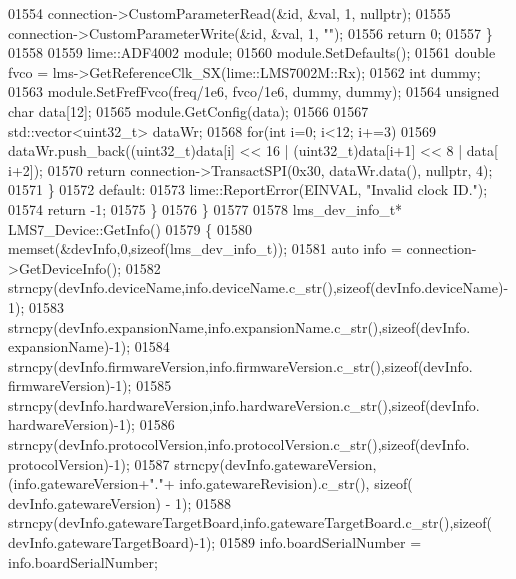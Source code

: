 \begin{DoxyCode}
{{{01554                 connection->CustomParameterRead(&\textcolor{keywordtype}{id}, &val, 1, \textcolor{keyword}{nullptr});
01555                 connection->CustomParameterWrite(&\textcolor{keywordtype}{id}, &val, 1, \textcolor{stringliteral}{""});
01556                 \textcolor{keywordflow}{return} 0;
01557             \}
01558 
01559             lime::ADF4002 module;
01560             module.SetDefaults();
01561             \textcolor{keywordtype}{double} fvco = lms->GetReferenceClk_SX(lime::LMS7002M::Rx);
01562             \textcolor{keywordtype}{int} dummy;
01563             module.SetFrefFvco(freq/1e6, fvco/1e6, dummy, dummy);
01564             \textcolor{keywordtype}{unsigned} \textcolor{keywordtype}{char} data[12];
01565             module.GetConfig(data);
01566 
01567             std::vector<uint32\_t> dataWr;
01568             \textcolor{keywordflow}{for}(\textcolor{keywordtype}{int} i=0; i<12; i+=3)
01569                 dataWr.push\_back((uint32\_t)data[i] << 16 | (uint32\_t)data[i+1] << 8 | data[
      i+2]);
01570             \textcolor{keywordflow}{return} connection->TransactSPI(0x30, dataWr.data(), \textcolor{keyword}{nullptr}, 4);
01571         \}
01572     \textcolor{keywordflow}{default}:
01573         lime::ReportError(EINVAL, \textcolor{stringliteral}{"Invalid clock ID."});
01574         \textcolor{keywordflow}{return} -1;
01575     \}
01576 \}
01577 
01578 lms_dev_info_t* LMS7_Device::GetInfo()
01579 \{
01580     memset(&devInfo,0,\textcolor{keyword}{sizeof}(lms_dev_info_t));
01581     \textcolor{keyword}{auto} info = connection->GetDeviceInfo();
01582     strncpy(devInfo.deviceName,info.deviceName.c\_str(),\textcolor{keyword}{sizeof}(devInfo.deviceName)-1);
01583     strncpy(devInfo.expansionName,info.expansionName.c\_str(),\textcolor{keyword}{sizeof}(devInfo.
      expansionName)-1);
01584     strncpy(devInfo.firmwareVersion,info.firmwareVersion.c\_str(),\textcolor{keyword}{sizeof}(devInfo.
      firmwareVersion)-1);
01585     strncpy(devInfo.hardwareVersion,info.hardwareVersion.c\_str(),\textcolor{keyword}{sizeof}(devInfo.
      hardwareVersion)-1);
01586     strncpy(devInfo.protocolVersion,info.protocolVersion.c\_str(),\textcolor{keyword}{sizeof}(devInfo.
      protocolVersion)-1);
01587     strncpy(devInfo.gatewareVersion, (info.gatewareVersion+\textcolor{stringliteral}{"."}+ info.gatewareRevision).c\_str(), \textcolor{keyword}{sizeof}(
      devInfo.gatewareVersion) - 1);
01588     strncpy(devInfo.gatewareTargetBoard,info.gatewareTargetBoard.c\_str(),\textcolor{keyword}{sizeof}(
      devInfo.gatewareTargetBoard)-1);
01589     info.boardSerialNumber = info.boardSerialNumber;
}}}
\end{DoxyCode}
